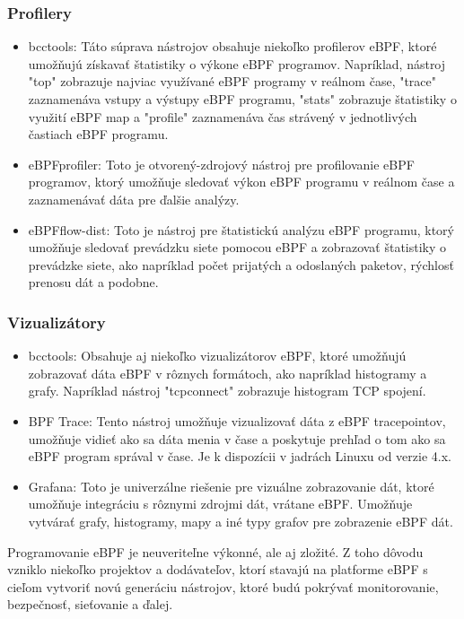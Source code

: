\subsubsection{Profilery} 
\begin{itemize}
    \item bcc\-tools: Táto súprava nástrojov obsahuje niekoľko profilerov eBPF, ktoré umožňujú získavať štatistiky o výkone eBPF programov. 
    Napríklad, nástroj "top" zobrazuje najviac využívané eBPF programy v reálnom čase, "trace" zaznamenáva vstupy a výstupy eBPF programu, 
    "stats" zobrazuje štatistiky o využití eBPF map a "profile" zaznamenáva čas strávený v jednotlivých častiach eBPF programu.
    \item eBPF\-profiler: Toto je otvorený-zdrojový nástroj pre profilovanie eBPF programov, ktorý umožňuje sledovať výkon eBPF programu v 
    reálnom čase a zaznamenávať dáta pre ďalšie analýzy.
    \item eBPF\-flow-dist: Toto je nástroj pre štatistickú analýzu eBPF programu, ktorý umožňuje sledovať prevádzku siete pomocou eBPF 
    a zobrazovať štatistiky o prevádzke siete, ako napríklad počet prijatých a odoslaných paketov, rýchlosť prenosu dát a podobne.
\end{itemize}

\subsubsection{Vizualizátory} 
\begin{itemize}
    \item bcc\-tools: Obsahuje aj niekoľko vizualizátorov eBPF, ktoré umožňujú zobrazovať dáta eBPF v rôznych formátoch, ako napríklad histogramy a grafy. 
    Napríklad nástroj "tcpconnect" zobrazuje histogram TCP spojení.
    \item BPF Trace: Tento nástroj umožňuje vizualizovať dáta z eBPF tracepointov, umožňuje vidieť ako sa dáta menia v čase a poskytuje 
    prehľad o tom ako sa eBPF program správal v čase. Je k dispozícii v jadrách Linuxu od verzie 4.x. 
    \item Grafana: Toto je univerzálne riešenie pre vizuálne zobrazovanie dát, ktoré umožňuje integráciu s rôznymi zdrojmi dát, vrátane eBPF. 
    Umožňuje vytvárať grafy, histogramy, mapy a iné typy grafov pre zobrazenie eBPF dát.
\end{itemize}
Programovanie eBPF je neuveriteľne výkonné, ale aj zložité. Z toho dôvodu vzniklo niekoľko projektov a dodávateľov, ktorí stavajú na platforme eBPF 
s cieľom vytvoriť novú generáciu nástrojov, ktoré budú pokrývať monitorovanie, bezpečnosť, sieťovanie a ďalej.

